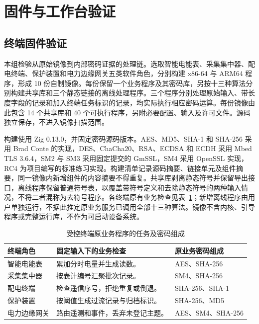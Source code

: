 \section{固件与工作台验证}
\label{sec:full-chain-power-plan}

\subsection{终端固件验证}
\label{sec:terminal-plan}

本组检验从原始镜像到内部密码证据的处理链。选取智能电能表、采集集中器、配电终端、保护装置和电力边缘网关五类软件角色，分别构建 x86-64 与 ARM64 程序，形成 10 份自制镜像。每份保留一个业务程序及其密码库，另按十三种算法分别构建共享库和三个静态链接的离线处理程序。三个程序分别处理原始输入、带长度字段的记录和加入终端任务标识的记录，均实际执行相应密码运算。每份镜像由此包含 14 个共享库和 40 个可执行程序，另附必要配置、输入及许可文件。源码独立保存，不进入镜像扫描范围。

构建使用 Zig 0.13.0，并固定密码源码版本。AES、MD5、SHA-1 和 SHA-256 采用 Brad Conte 的实现，DES、ChaCha20、RSA、ECDSA 和 ECDH 采用 Mbed TLS 3.6.4，SM2 与 SM3 采用固定提交的 GmSSL，SM4 采用 OpenSSL 实现，RC4 为项目编写的标准练习实现。构建清单记录源码摘要、链接单元及组件摘要，同一镜像内新增组件的内容摘要不得重复。共享库剥离静态符号并保留导出接口，离线程序保留普通符号表，以覆盖带符号定义和去除静态符号的两种输入情况，不将二者混称为去符号程序。各终端原有业务检查见表~\ref{tab:terminal-scenario-design}；新增离线程序由用户单独运行，不据此推定原业务服务已调用全部十三种算法。镜像不含内核、引导程序或完整运行库，不作为可启动设备系统。

\begin{table}[htbp]\centering\small
  \caption{受控终端原业务程序的任务及密码组成}
  \label{tab:terminal-scenario-design}
  \begin{tabularx}{\linewidth}{@{}>{\raggedright\arraybackslash}p{2.3cm}>{\raggedright\arraybackslash}X>{\raggedright\arraybackslash}p{3.0cm}@{}}\toprule
  终端角色 & 固定输入下的业务检查 & 原业务密码组成\\\midrule
  智能电能表 & 累加分时电量并生成读数。 & AES、SHA-256\\
  采集集中器 & 按表计编号汇聚批次记录。 & SM4、SHA-256\\
  配电终端 & 检查遥信序号，拒绝重复或倒退。 & SHA-256、SHA-1\\
  保护装置 & 按阈值生成过流记录与归档标识。 & SHA-256、MD5\\
  电力边缘网关 & 路由遥测和事件，丢弃未登记主题。 & AES、SM4、SHA-256\\\bottomrule
  \end{tabularx}
\end{table}
 
